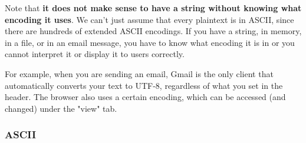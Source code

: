   Note that \textbf{it does not make sense to have a string without knowing what encoding it uses}. We can't just assume that every plaintext is in ASCII, since there are hundreds of extended ASCII encodings. If you have a string, in memory, in a file, or in an email message, you have to know what encoding it is in or you cannot interpret it or display it to users correctly. 

  For example, when you are sending an email, Gmail is the only client that automatically converts your text to UTF-8, regardless of what you set in the header. The browser also uses a certain encoding, which can be accessed (and changed) under the "view" tab. 

  \subsubsection{ASCII}

